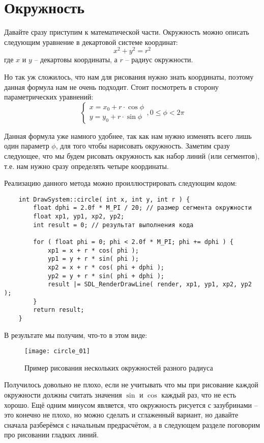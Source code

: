 \section{Окружность}
Давайте сразу приступим к математической части. Окружность можно описать следующим уравнение в декартовой 
системе координат:
\[
    x^2 + y^2 = r^2
\]
где \( x \) и \( y \) -- декартовы координаты, а \( r \) -- радиус окружности.

Но так уж сложилось, что нам для рисования нужно знать координаты, поэтому данная формула нам не очень 
подходит. Стоит посмотреть в сторону параметрических уравнений:
\[
    \left\{ \begin{array}{l}
        x = x_0 + r \cdot \cos\phi \\
        y = y_0 + r \cdot \sin\phi 
    \end{array} \right., 0 \leq \phi < 2\pi
\]

Данная формула уже намного удобнее, так как нам нужно изменять всего лишь один параметр \( \phi \), для 
того чтобы нарисовать окружность. Заметим сразу следующее, что мы будем рисовать окружность как набор 
линий (или сегментов), т.е. нам нужно сразу определять четыре координаты. 

Реализацию данного метода можно проиллюстрировать следующим кодом:

\begin{lstlisting}
    int DrawSystem::circle( int x, int y, int r ) {
        float dphi = 2.0f * M_PI / 20; // размер сегмента окружности
        float xp1, yp1, xp2, yp2;
        int result = 0; // результат выполнения кода

        for ( float phi = 0; phi < 2.0f * M_PI; phi += dphi ) {
            xp1 = x + r * cos( phi ); 
            yp1 = y + r * sin( phi );
            xp2 = x + r * cos( phi + dphi );
            yp2 = y + r * sin( phi + dphi );
            result |= SDL_RenderDrawLine( render, xp1, yp1, xp2, yp2 );
        } 
        return result;
    }
\end{lstlisting}

\pagebreak

В результате мы получим, что-то в этом виде:
\begin{figure}[ht!]
    \centering
    \texttt{[image: circle\_01]}
    \caption{Пример рисования нескольких окружностей разного радиуса}
    \label{img:circleExample}
\end{figure}

Получилось довольно не плохо, если не учитывать что мы при рисование каждой окружности должны считать 
значения \( \sin \) и \( \cos \) каждый раз, что не есть хорошо. Ещё одним минусом является, что 
окружность рисуется с зазубринами -- это конечно не плохо, но можно сделать и сглаженный вариант, но 
давайте сначала разберёмся с начальным предрасчётом, а в следующем разделе поговорим про рисовании 
гладких линий.

